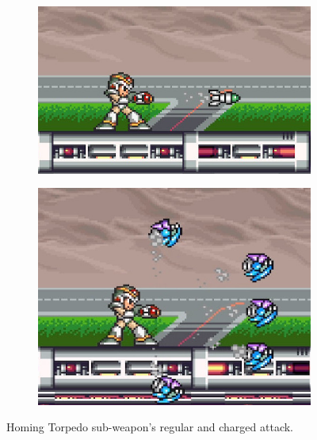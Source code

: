 \begin{figure}[htp]
	\centering
	\begin{subfigure}{0.39\linewidth}
		\includegraphics[width=\linewidth]{figures/X1/weapons/Homing_torpedo_1.jpg}	
	\end{subfigure}
	\begin{subfigure}{0.3\linewidth}
		\includegraphics[width=\linewidth]{figures/X1/weapons/Homing_torpedo_2.jpg}	
	\end{subfigure}
	\caption{Homing Torpedo sub-weapon's regular and charged attack.}
\end{figure}

